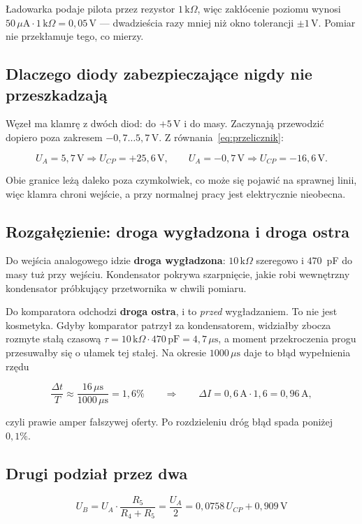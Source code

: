 \documentclass[a4paper,11pt]{article}
\newcommand{\kohm}{\,\mathrm{k}\Omega}
\newcommand{\volt}{\,\mathrm{V}}
\newcommand{\amp}{\,\mathrm{A}}
\newcommand{\us}{\,\mu\mathrm{s}}
\begin{document}
Ładowarka podaje pilota przez rezystor $1\kohm$, więc zakłócenie poziomu wynosi
$50\,\mu\mathrm{A}\cdot 1\kohm = 0{,}05\volt$ --- dwadzieścia razy mniej niż okno
tolerancji $\pm1\volt$. Pomiar nie przekłamuje tego, co mierzy.

\subsection{Dlaczego diody zabezpieczające nigdy nie przeszkadzają}

Węzeł ma klamrę z dwóch diod: do $+5\volt$ i do masy. Zaczynają przewodzić dopiero
poza zakresem $-0{,}7\ldots5{,}7\volt$. Z równania~\eqref{eq:przelicznik}:

\[
U_A=5{,}7\volt \Rightarrow U_{CP}=+25{,}6\volt,
\qquad
U_A=-0{,}7\volt \Rightarrow U_{CP}=-16{,}6\volt .
\]

Obie granice leżą daleko poza czymkolwiek, co może się pojawić na sprawnej linii,
więc klamra chroni wejście, a przy normalnej pracy jest elektrycznie nieobecna.

\subsection{Rozgałęzienie: droga wygładzona i droga ostra}

Do wejścia analogowego idzie \textbf{droga wygładzona}: $10\kohm$ szeregowo
i $470$~pF do masy tuż przy wejściu. Kondensator pokrywa szarpnięcie, jakie robi
wewnętrzny kondensator próbkujący przetwornika w chwili pomiaru.

Do komparatora odchodzi \textbf{droga ostra}, i to \emph{przed} wygładzaniem.
To nie jest kosmetyka. Gdyby komparator patrzył za kondensatorem, widziałby zbocza
rozmyte stałą czasową $\tau = 10\kohm\cdot470\,\mathrm{pF}=4{,}7\us$, a moment
przekroczenia progu przesuwałby się o ułamek tej stałej. Na okresie $1000\us$
daje to błąd wypełnienia rzędu

\[
\frac{\Delta t}{T}\approx\frac{16\us}{1000\us}=1{,}6\%
\qquad\Rightarrow\qquad
\Delta I = 0{,}6\amp\cdot1{,}6 = 0{,}96\amp,
\]

czyli prawie amper fałszywej oferty. Po rozdzieleniu dróg błąd spada poniżej
$0{,}1\%$.

\subsection{Drugi podział przez dwa}

\begin{equation}
U_B=U_A\cdot\frac{R_5}{R_4+R_5}=\frac{U_A}{2}=0{,}0758\,U_{CP}+0{,}909\volt
\label{eq:wezelB}
\end{equation}
\end{document}

